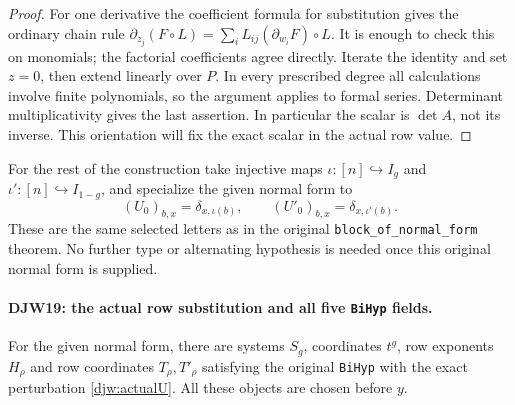 \begin{proof}
For one derivative the coefficient formula for substitution gives
the ordinary chain rule
$\partial_{z_j}(F\circ L)
=\sum_iL_{ij}(\partial_{w_i}F)\circ L$.
It is enough to check this on monomials; the factorial coefficients
agree directly.  Iterate the identity and set $z=0$, then extend
linearly over $P$.  In every prescribed degree all calculations
involve finite polynomials, so the argument applies to formal
series.  Determinant multiplicativity gives the last assertion.
In particular the scalar is $\det A$, not its inverse.  This
orientation will fix the exact scalar in the actual row value.
\end{proof}

For the rest of the construction take injective maps
$\iota:[n]\hookrightarrow I_g$ and
$\iota':[n]\hookrightarrow I_{1-g}$, and specialize the
given normal form to
\[
 (U_0)_{b,x}=\delta_{x,\iota(b)},\qquad
 (U'_0)_{b,x}=\delta_{x,\iota'(b)}.
\]
These are the same selected letters as in the original
\texttt{block\_of\_normal\_form} theorem.  No further
type or alternating hypothesis is needed once this original
normal form is supplied.

\paragraph{DJW19: the actual row substitution and all five \texttt{BiHyp} fields.}
\label{claim:DJW19}
For the given normal form, there are systems $S_g$, coordinates
$t^g$, row exponents $H_\rho$ and row coordinates
$T_\rho,T'_\rho$ satisfying the original \texttt{BiHyp} with
the exact perturbation \eqref{djw:actualU}.
All these objects are chosen before $y$.

